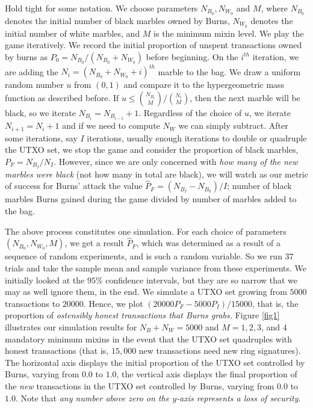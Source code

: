 \documentclass{mrl}
\begin{document}
Hold tight for some notation. We choose parameters $N_{B_0}, N_{W_0}$ and $M$, where $N_{B_0}$ denotes the initial number of black marbles owned by Burns, $N_{W_0}$ denotes the initial number of white marbles, and $M$ is the minimum mixin level. We play the game iteratively. We record the initial proportion of unspent transactions owned by burns as $P_0 = N_{B_0}/(N_{B_0} + N_{W_0})$ before beginning. On the $i^{th}$ iteration, we are adding the $N_i = (N_{B_0} + N_{W_0} + i)^{th}$ marble to the bag. We draw a uniform random number $u$ from $(0,1)$ and compare it to the hypergeometric mass function as described before. If $u \leq \binom{N_{B_i}}{M}/\binom{N_i}{M}$, then the next marble will be black, so we iterate $N_{B_i} = N_{B_{i-1}}+1$. Regardless of the choice of $u$, we iterate $N_{i+1} = N_{i} + 1$ and if we need to compute $N_W$ we can simply subtract. After some iterations, say $I$ iterations, usually enough iterations to double or quadruple the UTXO set, we stop the game and consider the proportion of black marbles, $P_F = N_{B_I}/N_I$. However, since we are only concerned with \emph{how many of the new marbles were black} (not how many in total are black), we will watch as our metric of success for Burns' attack the value $\widehat{P}_F = (N_{B_I} - N_{B_0})/I$; number of black marbles Burns gained during the game divided by number of marbles added to the bag.

The above process constitutes one simulation. For each choice of parameters $(N_{B_0}, N_{W_0}, M)$, we get a result $\widehat{P}_F$, which was determined as a result of a sequence of random experiments, and is such a random variable. So we run $37$ trials and take the sample mean and sample variance from these experiments. We initially looked at the $95\%$ confidence intervals, but they are so narrow that we may as well ignore them, in the end. We simulate a UTXO set growing from $5000$ transactions to $20000$. Hence, we plot $(20000P_F - 5000P_I)/15000$, that is, the proportion of \emph{ostensibly honest transactions that Burns grabs.} Figure \ref{fig1} illustrates our simulation results for $N_B+N_W = 5000$ and $M=1, 2, 3$, and $4$ mandatory minimum mixins in the event that the UTXO set quadruples with honest transactions (that is, $15,000$ new transactions need new ring signatures). The horizontal axis displays the initial proportion of the UTXO set controlled by Burns, varying from $0.0$ to $1.0$, the vertical axis displays the final proportion of the \emph{new} transactions in the UTXO set controlled by Burns, varying from $0.0$ to $1.0$. Note that \emph{any number above zero on the $y$-axis represents a loss of security}.
\end{document}
